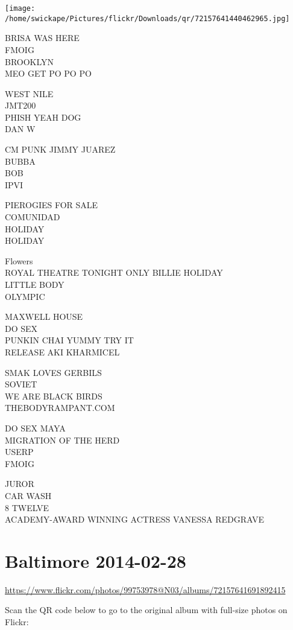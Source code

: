 \documentclass[10pt,letterpaper]{article}
\begin{document}
\texttt{[image: /home/swickape/Pictures/flickr/Downloads/qr/72157641440462965.jpg]}


BRISA WAS HERE\\
FMOIG\\
BROOKLYN\\
MEO GET PO PO PO

WEST NILE\\
JMT200\\
PHISH YEAH DOG\\
DAN W

CM PUNK JIMMY JUAREZ\\
BUBBA\\
BOB\\
IPVI

PIEROGIES FOR SALE\\
COMUNIDAD\\
HOLIDAY\\
HOLIDAY

Flowers\\
ROYAL THEATRE TONIGHT ONLY BILLIE HOLIDAY\\
LITTLE BODY\\
OLYMPIC

MAXWELL HOUSE\\
DO SEX\\
PUNKIN CHAI YUMMY TRY IT\\
RELEASE AKI KHARMICEL

SMAK LOVES GERBILS\\
SOVIET\\
WE ARE BLACK BIRDS\\
THEBODYRAMPANT.COM

DO SEX MAYA\\
MIGRATION OF THE HERD\\
USERP\\
FMOIG

JUROR\\
CAR WASH\\
8 TWELVE\\
ACADEMY{-}AWARD WINNING ACTRESS VANESSA REDGRAVE


\section*{Baltimore 2014-02-28}

\url{https://www.flickr.com/photos/99753978@N03/albums/72157641691892415}

Scan the QR code below to go to the original album with full-size photos on Flickr:
\end{document}
